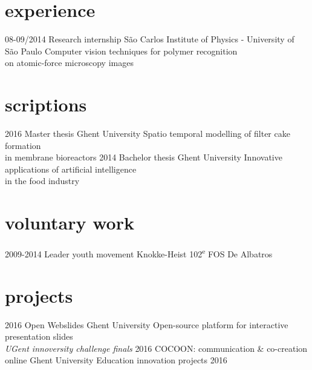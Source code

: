 \documentclass[]{friggeri-cv}
\begin{document}
\section{experience}
\begin{entrylist}
  \entry
    {08-09/2014}
    {Research internship}
    {S\~{a}o Carlos Institute of Physics - University of S\~{a}o Paulo}
    {Computer vision techniques for polymer recognition\\ on atomic-force microscopy images}
\end{entrylist}

\section{scriptions}
\begin{entrylist}
  \entry
    {2016}
    {Master thesis}
    {Ghent University}
    {Spatio temporal modelling of filter cake formation\\ in membrane bioreactors}
  \entry
    {2014}
    {Bachelor thesis}
    {Ghent University}
    {Innovative applications of artificial intelligence\\ in the food industry}
\end{entrylist}

\section{voluntary work}
\begin{entrylist}
 \entry
    {2009-2014}
    {Leader youth movement}
    {Knokke-Heist}
    {102\textsuperscript{e} FOS De Albatros}
\end{entrylist} 
\section{projects}
\begin{entrylist}
 \entry
 {2016}
 {Open Webslides}
 {Ghent University}
 {Open-source platform for interactive presentation slides \\ \emph{UGent innoversity challenge finals}}
 \entry
 {2016}
 {COCOON: communication \& co-creation online}
 {Ghent University}
 {Education innovation projects 2016}
  
\end{entrylist} 
\end{document}
